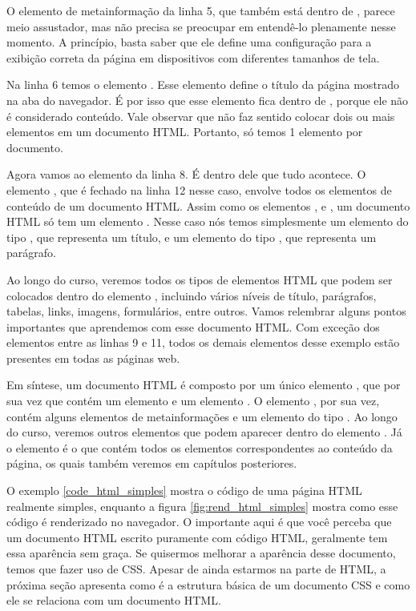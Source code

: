 O elemento de metainformação da linha 5, que também está dentro de , parece meio assustador, mas não precisa se preocupar em entendê-lo plenamente nesse momento. A princípio, basta saber que ele define uma configuração para a exibição correta da página em dispositivos com diferentes tamanhos de tela.

Na linha 6 temos o elemento . Esse elemento define o título da página mostrado na aba do navegador. É por isso que esse elemento fica dentro de , porque ele não é considerado conteúdo. Vale observar que não faz sentido colocar dois ou mais elementos  em um documento HTML. Portanto, só temos 1 elemento  por documento.

Agora vamos ao elemento da linha 8. É dentro dele que tudo acontece. O elemento , que é fechado na linha 12 nesse caso, envolve todos os elementos de conteúdo de um documento HTML. Assim como os elementos ,  e , um documento HTML só tem um elemento . Nesse caso nós temos simplesmente um elemento do tipo , que representa um título, e um elemento do tipo , que representa um parágrafo.

Ao longo do curso, veremos todos os tipos de elementos HTML que podem ser colocados dentro do elemento , incluindo vários níveis de título, parágrafos, tabelas, links, imagens, formulários, entre outros. Vamos relembrar alguns pontos importantes que aprendemos com esse documento HTML. Com exceção dos elementos entre as linhas 9 e 11, todos os demais elementos desse exemplo estão presentes em todas as páginas web.

Em síntese, um documento HTML é composto por um único elemento , que por sua vez que contém um elemento  e um elemento . O elemento , por sua vez, contém alguns elementos de metainformações e um elemento do tipo . Ao longo do curso, veremos outros elementos que podem aparecer dentro do elemento . Já o elemento  é o que contém todos os elementos correspondentes ao conteúdo da página, os quais também veremos em capítulos posteriores.

O exemplo \ref{code_html_simples} mostra o código de uma página HTML realmente simples, enquanto a figura \ref{fig:rend_html_simples} mostra como esse código é renderizado no navegador. O importante aqui é que você perceba que um documento HTML escrito puramente com código HTML, geralmente tem essa aparência sem graça. Se quisermos melhorar a aparência desse documento, temos que fazer uso de CSS. Apesar de ainda estarmos na parte de HTML, a próxima seção apresenta como é a estrutura básica de um documento CSS e como ele se relaciona com um documento HTML.

